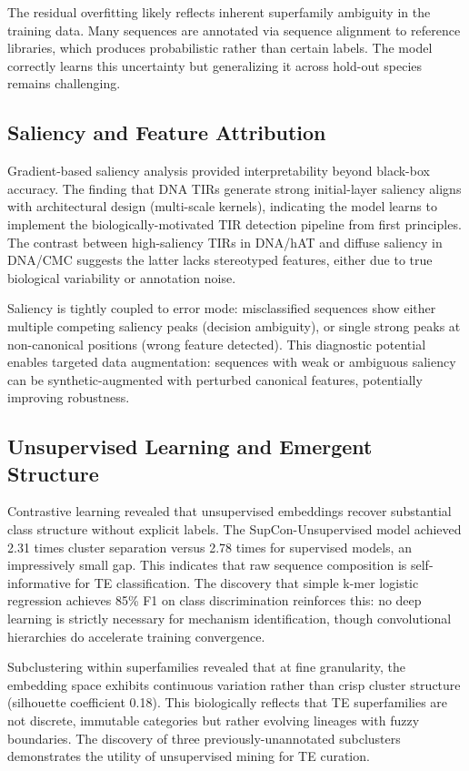\documentclass[12pt]{article}
\begin{document}
The residual overfitting likely reflects inherent superfamily ambiguity in the training data. Many sequences are annotated via sequence alignment to reference libraries, which produces probabilistic rather than certain labels. The model correctly learns this uncertainty but generalizing it across hold-out species remains challenging. 

\subsection{Saliency and Feature Attribution}

Gradient-based saliency analysis provided interpretability beyond black-box accuracy. The finding that DNA TIRs generate strong initial-layer saliency aligns with architectural design (multi-scale kernels), indicating the model learns to implement the biologically-motivated TIR detection pipeline from first principles. The contrast between high-saliency TIRs in DNA/hAT and diffuse saliency in DNA/CMC suggests the latter lacks stereotyped features, either due to true biological variability or annotation noise.

Saliency is tightly coupled to error mode: misclassified sequences show either multiple competing saliency peaks (decision ambiguity), or single strong peaks at non-canonical positions (wrong feature detected). This diagnostic potential enables targeted data augmentation: sequences with weak or ambiguous saliency can be synthetic-augmented with perturbed canonical features, potentially improving robustness.

\subsection{Unsupervised Learning and Emergent Structure}

Contrastive learning revealed that unsupervised embeddings recover substantial class structure without explicit labels. The SupCon-Unsupervised model achieved 2.31 times cluster separation versus 2.78 times for supervised models, an impressively small gap. This indicates that raw sequence composition is self-informative for TE classification. The discovery that simple k-mer logistic regression achieves 85\% F1 on class discrimination reinforces this: no deep learning is strictly necessary for mechanism identification, though convolutional hierarchies do accelerate training convergence. 

Subclustering within superfamilies revealed that at fine granularity, the embedding space exhibits continuous variation rather than crisp cluster structure (silhouette coefficient 0.18). This biologically reflects that TE superfamilies are not discrete, immutable categories but rather evolving lineages with fuzzy boundaries. The discovery of three previously-unannotated subclusters demonstrates the utility of unsupervised mining for TE curation.
\end{document}
